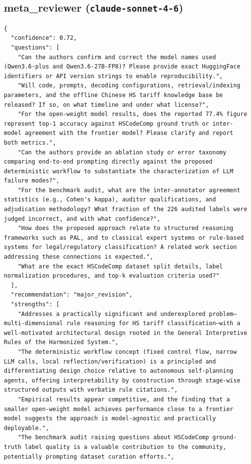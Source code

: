 \documentclass[11pt]{article}
\begin{document}
\subsection*{meta_reviewer (\texttt{claude-sonnet-4-6})}
\begin{verbatim}
{
  "confidence": 0.72,
  "questions": [
    "Can the authors confirm and correct the model names used (Qwen3.6-plus and Qwen3.6-27B-FP8)? Please provide exact HuggingFace identifiers or API version strings to enable reproducibility.",
    "Will code, prompts, decoding configurations, retrieval/indexing parameters, and the offline Chinese HS tariff knowledge base be released? If so, on what timeline and under what license?",
    "For the open-weight model results, does the reported 77.4% figure represent top-1 accuracy against HSCodeComp ground truth or inter-model agreement with the frontier model? Please clarify and report both metrics.",
    "Can the authors provide an ablation study or error taxonomy comparing end-to-end prompting directly against the proposed deterministic workflow to substantiate the characterization of LLM failure modes?",
    "For the benchmark audit, what are the inter-annotator agreement statistics (e.g., Cohen's kappa), auditor qualifications, and adjudication methodology? What fraction of the 226 audited labels were judged incorrect, and with what confidence?",
    "How does the proposed approach relate to structured reasoning frameworks such as PAL, and to classical expert systems or rule-based systems for legal/regulatory classification? A related work section addressing these connections is expected.",
    "What are the exact HSCodeComp dataset split details, label normalization procedures, and top-k evaluation criteria used?"
  ],
  "recommendation": "major_revision",
  "strengths": [
    "Addresses a practically significant and underexplored problem—multi-dimensional rule reasoning for HS tariff classification—with a well-motivated architectural design rooted in the General Interpretive Rules of the Harmonized System.",
    "The deterministic workflow concept (fixed control flow, narrow LLM calls, local reflection/verification) is a principled and differentiating design choice relative to autonomous self-planning agents, offering interpretability by construction through stage-wise structured outputs with verbatim rule citations.",
    "Empirical results appear competitive, and the finding that a smaller open-weight model achieves performance close to a frontier model suggests the approach is model-agnostic and practically deployable.",
    "The benchmark audit raising questions about HSCodeComp ground-truth label quality is a valuable contribution to the community, potentially prompting dataset curation efforts.",

\end{verbatim}
\end{document}
